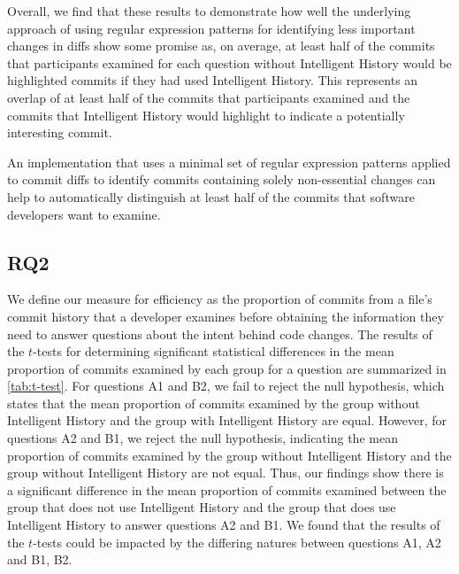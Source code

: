 Overall, we find that these results to demonstrate how well the underlying approach of using regular expression
patterns for identifying less important changes in diffs show some promise as, on average,
at least half of the commits that participants examined for each question without Intelligent History
would be highlighted commits if they had used Intelligent History.
This represents an overlap of at least half of the commits that participants examined and the commits
that Intelligent History would highlight to indicate a potentially interesting commit.

\begin{summary}[RQ1]
  An implementation that uses a minimal set of regular expression patterns 
  applied to commit diffs to identify commits containing solely non-essential changes can help to
  automatically distinguish at least half of the commits that software
  developers want to examine.
\end{summary}


\subsection{RQ2}
\label{subsec:RQ2}


We define our measure for efficiency as the proportion of commits from a file's commit history 
that a developer examines before obtaining the information they need to answer questions about the intent behind code changes.
The results of the $t$-tests for determining significant statistical differences in 
the mean proportion of commits examined by each group for a question are summarized in \autoref{tab:t-test}.
For questions A1 and B2, we fail to reject the null hypothesis, which states that the mean proportion of commits examined 
by the group without Intelligent History and the group with Intelligent History are equal.
However, for questions A2 and B1, we reject the null hypothesis, indicating the mean proportion of commits examined 
by the group without Intelligent History and the group without Intelligent History are not equal.
Thus, our findings show there is a significant difference in the mean proportion of commits examined between 
the group that does not use Intelligent History and the group that does use Intelligent History to answer questions A2 and B1.
We found that the results of the $t$-tests could be impacted by the differing natures between questions A1, A2 and B1, B2.

